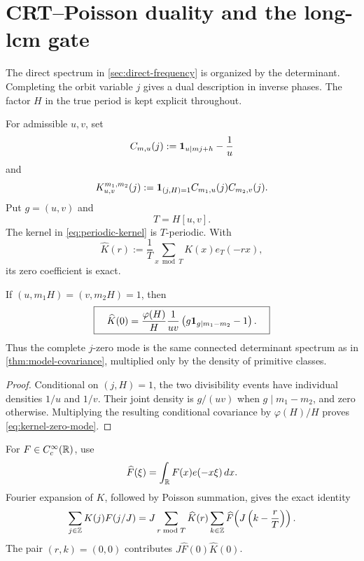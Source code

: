 \section{CRT--Poisson duality and the long-lcm gate}
\label{sec:poisson}

The direct spectrum in \cref{sec:direct-frequency} is organized by the
determinant.  Completing the orbit variable \(j\) gives a dual
description in inverse phases.  The factor \(H\) in the true period is
kept explicit throughout.

For admissible \(u,v\), set
\begin{equation}
 C_{m,u}(j):=\mathbf 1_{u\mid mj+h}-\frac1u
 \label{eq:centered-indicator}
\end{equation}
and
\begin{equation}
 K_{u,v}^{m_1,m_2}(j)
 :=\mathbf 1_{(j,H)=1}C_{m_1,u}(j)C_{m_2,v}(j).
 \label{eq:periodic-kernel}
\end{equation}
Put \(g=(u,v)\) and
\begin{equation}
 T=H[u,v].
 \label{eq:true-period}
\end{equation}
The kernel in \eqref{eq:periodic-kernel} is \(T\)-periodic.  With
\begin{equation}
 \widehat K(r):=\frac1T\sum_{x\bmod T}K(x)e_T(-rx),
 \label{eq:kernel-fourier}
\end{equation}
its zero coefficient is exact.

\begin{proposition}
\label{prop:kernel-zero-mode}
If \((u,m_1H)=(v,m_2H)=1\), then
\begin{equation}
 \boxed{\quad
 \widehat K(0)
 =\frac{\varphi(H)}H\frac1{uv}
 \left(g\mathbf 1_{g\mid m_1-m_2}-1\right).
 \quad}
 \label{eq:kernel-zero-mode}
\end{equation}
Thus the complete \(j\)-zero mode is the same connected determinant
spectrum as in \cref{thm:model-covariance}, multiplied only by the
density of primitive classes.
\end{proposition}

\begin{proof}
Conditional on \((j,H)=1\), the two divisibility events have
individual densities \(1/u\) and \(1/v\).  Their joint density is
\(g/(uv)\) when \(g\mid m_1-m_2\), and zero otherwise.  Multiplying
the resulting conditional covariance by \(\varphi(H)/H\) proves
\eqref{eq:kernel-zero-mode}.
\end{proof}

For \(F\in C_c^\infty(\mathbb R)\), use
\begin{equation}
 \widehat F(\xi)=\int_{\mathbb R}F(x)e(-x\xi)\,dx.
 \label{eq:F-transform}
\end{equation}
Fourier expansion of \(K\), followed by Poisson summation, gives the
exact identity
\begin{equation}
 \sum_{j\in\mathbb Z}K(j)F(j/J)
 =J\sum_{r\bmod T}\widehat K(r)
 \sum_{k\in\mathbb Z}\widehat F\!\left(J\left(k-\frac rT\right)\right).
 \label{eq:kernel-poisson}
\end{equation}
The pair \((r,k)=(0,0)\) contributes
\(J\widehat F(0)\widehat K(0)\).

